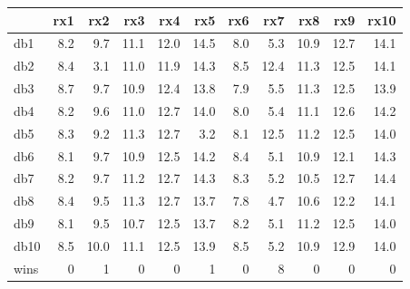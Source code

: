 \begin{tabular}{@{}l*{10}{r}@{}}
\toprule
 & rx1 & rx2 & rx3 & rx4 & rx5 & rx6 & rx7 & rx8 & rx9 & rx10\\
\midrule
db1 & 8.2 & 9.7 & 11.1 & 12.0 & 14.5 & 8.0 & \cellcolor{black!15}5.3 & 10.9 & 12.7 & 14.1\\
db2 & 8.4 & \cellcolor{black!15}3.1 & 11.0 & 11.9 & 14.3 & 8.5 & 12.4 & 11.3 & 12.5 & 14.1\\
db3 & 8.7 & 9.7 & 10.9 & 12.4 & 13.8 & 7.9 & \cellcolor{black!15}5.5 & 11.3 & 12.5 & 13.9\\
db4 & 8.2 & 9.6 & 11.0 & 12.7 & 14.0 & 8.0 & \cellcolor{black!15}5.4 & 11.1 & 12.6 & 14.2\\
db5 & 8.3 & 9.2 & 11.3 & 12.7 & \cellcolor{black!15}3.2 & 8.1 & 12.5 & 11.2 & 12.5 & 14.0\\
db6 & 8.1 & 9.7 & 10.9 & 12.5 & 14.2 & 8.4 & \cellcolor{black!15}5.1 & 10.9 & 12.1 & 14.3\\
db7 & 8.2 & 9.7 & 11.2 & 12.7 & 14.3 & 8.3 & \cellcolor{black!15}5.2 & 10.5 & 12.7 & 14.4\\
db8 & 8.4 & 9.5 & 11.3 & 12.7 & 13.7 & 7.8 & \cellcolor{black!15}4.7 & 10.6 & 12.2 & 14.1\\
db9 & 8.1 & 9.5 & 10.7 & 12.5 & 13.7 & 8.2 & \cellcolor{black!15}5.1 & 11.2 & 12.5 & 14.0\\
db10 & 8.5 & 10.0 & 11.1 & 12.5 & 13.9 & 8.5 & \cellcolor{black!15}5.2 & 10.9 & 12.9 & 14.0\\
\midrule
wins & 0 & 1 & 0 & 0 & 1 & 0 & 8 & 0 & 0 & 0\\
\bottomrule
\end{tabular}
